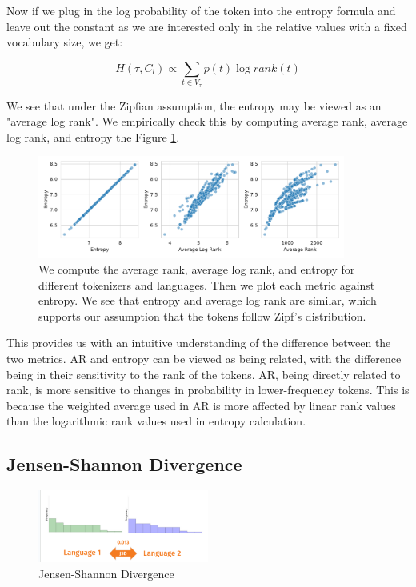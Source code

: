 Now if we plug in the log probability of the token into the entropy formula and leave out the constant as we are interested only in the relative values with a fixed vocabulary size, we get:

\begin{equation}
    H(\tau, C_l) \propto \sum_{t \in V_\tau} p(t) \log rank(t)
\end{equation}

We see that under the Zipfian assumption, the entropy may be viewed as an "average log rank". We empirically check this by computing average rank, average log rank, and entropy the Figure \ref{fig:ar_alr_entropy}.

\begin{figure}
    \centering
    \includegraphics[width=0.9\textwidth]{figures/ar_alr_entropy.pdf}
    \caption{We compute the average rank, average log rank, and entropy for different tokenizers and languages. Then we plot each metric against entropy. We see that entropy and average log rank are similar, which supports our assumption that the tokens follow Zipf's distribution.}
    \label{fig:ar_alr_entropy}
\end{figure}

This provides us with an intuitive understanding of the difference between the two metrics. AR and entropy can be viewed as being related, with the difference being in their sensitivity to the rank of the tokens. AR, being directly related to rank, is more sensitive to changes in probability in lower-frequency tokens. This is because the weighted average used in AR is more affected by linear rank values than the logarithmic rank values used in entropy calculation.

\subsection{Jensen-Shannon Divergence}
\label{sec:jsd}

\begin{figure}[h]
    \centering
    \includegraphics[width=0.5\textwidth]{img/temp/jsd_example.png}
    \caption{Jensen-Shannon Divergence }
    \label{fig:jsd_example}
\end{figure}

